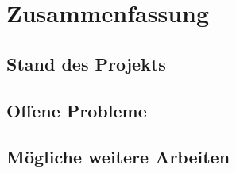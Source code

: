 \chapter{Zusammenfassung}
    \section{Stand des Projekts}
    
    \section{Offene Probleme}
    
    \section{Mögliche weitere Arbeiten}